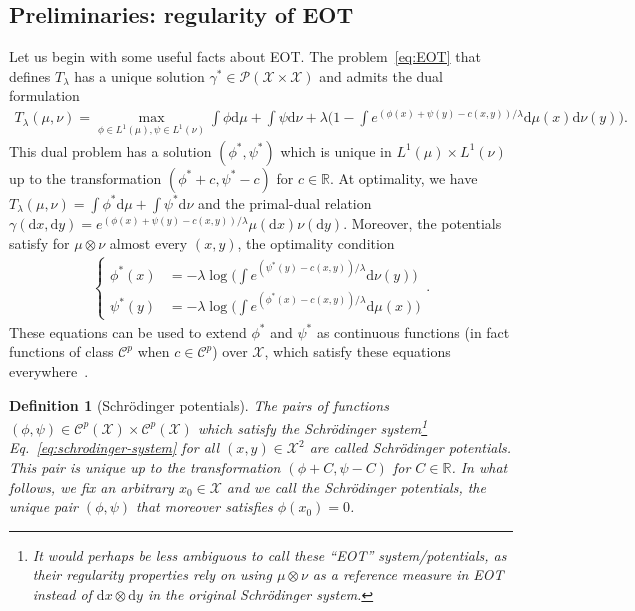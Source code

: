 \documentclass[11pt]{article}
\newcommand{\rev}[1]{{#1}}
\newcommand{\RR}{\mathbb{R}}
\newcommand{\Cc}{\mathcal{C}}
\newcommand{\Pp}{\mathcal{P}}
\newcommand{\Xx}{\mathcal{X}}
\renewcommand{\d}{\mathrm{d}}
\newtheorem{definition}[theorem]{Definition}
\begin{document}
\subsection{Preliminaries: regularity of EOT} Let us begin with some useful facts about EOT. The problem~\eqref{eq:EOT} that defines $T_\lambda$ has a unique solution $\gamma^*\in \Pp(\Xx\times \Xx)$ and admits the dual formulation
\begin{align}\label{eq:dual-EOT}
T_\lambda(\mu,\nu) = \max_{\phi\in L^1(\mu),\psi\in L^1(\nu)} \int \phi \d\mu + \int \psi \d\nu +\lambda \Big(1 - \int e^{(\phi(x)+\psi(y)-c(x,y))/\lambda}\d\mu(x)\d\nu(y)\Big).
\end{align}
This dual problem has a solution $(\phi^*,\psi^*)$ which is unique in $L^1(\mu)\times L^1(\nu)$ up to the transformation $(\phi^*+c,\psi^*-c)$ for $c\in \RR$. At optimality, we have $T_\lambda(\mu,\nu) = \int \phi^*\d\mu + \int \psi^*\d\nu$ and the primal-dual relation
$
\gamma(\d x,\d y) = e^{(\phi(x)+\psi(y)-c(x,y))/\lambda}\mu(\d x)\nu(\d y).
$
Moreover, the potentials satisfy for $\mu\otimes \nu$ almost every $(x,y)$, the optimality condition
\begin{align}\label{eq:schrodinger-system}
\left\{
\begin{aligned}
\phi^*(x) &= -\lambda \log \Big( \int e^{(\psi^*(y)-c(x,y))/\lambda}\d\nu(y)\Big)\\
\psi^*(y) &= -\lambda \log \Big( \int e^{(\phi^*(x)-c(x,y))/\lambda}\d\mu(x)\Big)
\end{aligned}
\right. 
.
\end{align}
These equations can be used to extend $\phi^*$ and $\psi^*$ as continuous functions (in fact functions of class $\Cc^p$ when $c\in \Cc^p$) over $\Xx$, which satisfy these equations everywhere~\cite{genevay2019sample}. 

\begin{definition}[Schr\"odinger potentials]\label{def:potentials}
The pairs of functions $(\phi,\psi)\in \Cc^p(\Xx)\times \Cc^p(\Xx)$ which satisfy the \emph{Schr\"odinger system}\footnote{It would perhaps be less ambiguous to call these ``EOT'' system/potentials, as their regularity properties rely on using $\mu\otimes \nu$ as a reference measure in EOT instead of $\d x \otimes \d y$ in the original Schr\"odinger system.} Eq.~\eqref{eq:schrodinger-system} for all $(x,y)\in \Xx^2$ are called \emph{Schr\"odinger} potentials. This pair is unique up to the transformation $(\phi+C,\psi-C)$ for $C\in \RR$. \rev{In what follows, we fix an arbitrary $x_0\in \Xx$ and we call \emph{the} Schr\"odinger potentials, the unique pair $(\phi,\psi)$ that moreover satisfies $\phi(x_0)=0$.}
\end{definition}
\end{document}
